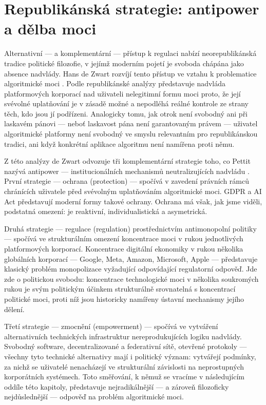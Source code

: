 \section{Republikánská strategie: antipower a dělba moci}

Alternativní — a komplementární — přístup k regulaci nabízí neorepublikánská tradice politické filozofie, v jejímž moderním pojetí je svoboda chápána jako absence nadvlády. Hans de Zwart rozvíjí tento přístup ve vztahu k problematice algoritmické moci \parencite{Zwart17}. Podle republikánské analýzy představuje nadvláda platformových korporací nad uživateli nelegitimní formu moci proto, že její svévolné uplatňování je v zásadě možné a nepodléhá reálné kontrole ze strany těch, kdo jsou jí podřízeni. Analogicky tomu, jak otrok není svobodný ani při laskavém pánovi — neboť laskavost pána není garantovaným právem — uživatel algoritmické platformy není svobodný ve smyslu relevantním pro republikánskou tradici, ani když konkrétní aplikace algoritmu není namířena proti němu.

Z této analýzy de Zwart odvozuje tři komplementární strategie toho, co Pettit nazývá antipower — institucionálních mechanismů neutralizujících nadvládu \parencite{Pettit97}. První strategie — ochrana (protection) — spočívá v zavedení právních rámců chránících uživatele před svévolným uplatňováním algoritmické moci. GDPR a AI Act představují moderní formy takové ochrany.
Ochrana má však, jak jsme viděli, podstatná omezení: je reaktivní, individualistická a asymetrická.

Druhá strategie — regulace (regulation) prostřednictvím antimonopolní politiky — spočívá ve strukturálním omezení koncentrace moci v rukou jednotlivých platformových korporací. Koncentrace digitální ekonomiky v rukou několika globálních korporací — Google, Meta, Amazon, Microsoft, Apple — představuje klasický problém monopolizace vyžadující odpovídající regulatorní odpověď. Jde zde o politickou svobodu: koncentrace technologické moci v několika soukromých rukou je svým politickým účinkem strukturálně srovnatelná s koncentrací politické moci, proti níž jsou historicky namířeny ústavní mechanismy jejího dělení.

Třetí strategie — zmocnění (empowerment) — spočívá ve vytváření alternativních technických infrastruktur nereprodukujících logiku nadvlády. Svobodný software, decentralizované a federativní sítě, otevřené protokoly — všechny tyto technické alternativy mají i politický význam: vytvářejí podmínky, za nichž se uživatelé nenacházejí ve strukturální závislosti na neprostupných korporátních systémech. Toto směřování, k němuž se vracíme v následujícím oddíle této kapitoly, představuje nejradikálnější — a zároveň filozoficky nejdůslednější — odpověď na problém algoritmické moci.



